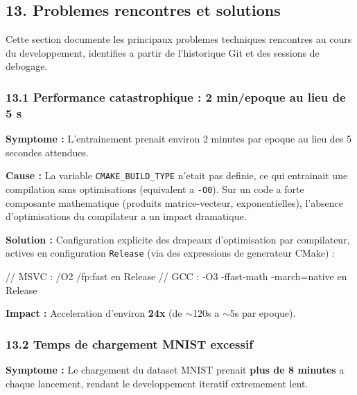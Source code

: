 \documentclass[
  letterpaper,
  DIV=11,
  numbers=noendperiod]{scrartcl}
\newenvironment{Shaded}{\begin{snugshade}}{\end{snugshade}}
\newcommand{\CommentTok}[1]{\textcolor[rgb]{0.37,0.37,0.37}{#1}}
\begin{document}
\subsection{13. Problemes rencontres et solutions}\label{problemes-rencontres}

Cette section documente les principaux problemes techniques rencontres au cours du developpement, identifies a partir de l'historique Git et des sessions de debogage.

\subsubsection{13.1 Performance catastrophique : 2 min/epoque au lieu de 5 s}\label{perf-catastrophique}

\textbf{Symptome :} L'entrainement prenait environ 2 minutes par epoque au lieu des 5 secondes attendues.

\textbf{Cause :} La variable \texttt{CMAKE\_BUILD\_TYPE} n'etait pas definie, ce qui entrainait une compilation sans optimisations (equivalent a \texttt{-O0}). Sur un code a forte composante mathematique (produits matrice-vecteur, exponentielles), l'absence d'optimisations du compilateur a un impact dramatique.

\textbf{Solution :} Configuration explicite des drapeaux d'optimisation par compilateur, actives en configuration \texttt{Release} (via des expressions de generateur CMake) :

\begin{Shaded}
\begin{Highlighting}[]
\CommentTok{// MSVC : /O2 /fp:fast en Release}
\CommentTok{// GCC  : -O3 -ffast-math -march=native en Release}
\end{Highlighting}
\end{Shaded}

\textbf{Impact :} Acceleration d'environ \textbf{24x} (de $\sim$120s a $\sim$5s par epoque).

\subsubsection{13.2 Temps de chargement MNIST excessif}\label{chargement-lent}

\textbf{Symptome :} Le chargement du dataset MNIST prenait \textbf{plus de 8 minutes} a chaque lancement, rendant le developpement iteratif extremement lent.
\end{document}
